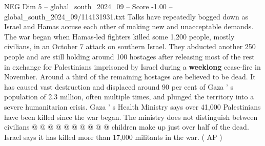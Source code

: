 \begin{textsample}{NEG Dim 5 – global\_south\_2024\_09 – Score -1.00 – global\_south\_2024\_09/114131931.txt}
Talks have repeatedly bogged down as Israel and Hamas accuse each other of making new and unacceptable demands.
The war began when Hamas-led fighters killed some 1,200 people, mostly civilians, in an October 7 attack on southern Israel.
They abducted another 250 people and are still holding around 100 hostages after releasing most of the rest in exchange for Palestinians imprisoned by Israel during a \textbf{weeklong} cease-fire in November.
Around a third of the remaining hostages are believed to be dead.
It has caused vast destruction and displaced around 90 per cent of Gaza ' s population of 2.3 million, often multiple times, and plunged the territory into a severe humanitarian crisis.
Gaza ' s Health Ministry says over 41,000 Palestinians have been killed since the war began.
The ministry does not distinguish between civilians @ @ @ @ @ @ @ @ @ @ children make up just over half of the dead.
Israel says it has killed more than 17,000 militants in the war. ( AP )

\end{textsample}
